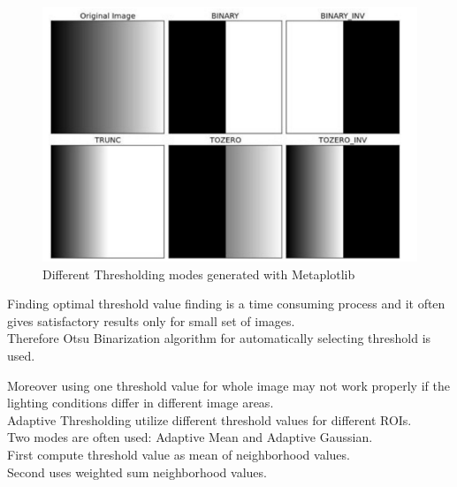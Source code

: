 \documentclass[12pt,twoside,a4paper]{article}
\begin{document}
\begin{figure}[H]
\centering
\includegraphics[width=0.4\paperwidth]{thr}
\caption{Different Thresholding modes generated with Metaplotlib}
\end{figure}



Finding optimal threshold value finding is a time consuming process and it often gives satisfactory results only for small set of images.\\
Therefore Otsu Binarization algorithm for automatically selecting threshold is used.

Moreover using one threshold value for whole image may not work properly if the lighting conditions differ in different image areas.\cite{thre}\\
Adaptive Thresholding utilize different threshold values for different ROIs.\\
Two modes are often used: Adaptive Mean and Adaptive Gaussian.\\
First compute threshold value as mean of neighborhood values.\\
Second uses weighted sum neighborhood values.
 
\end{document}
